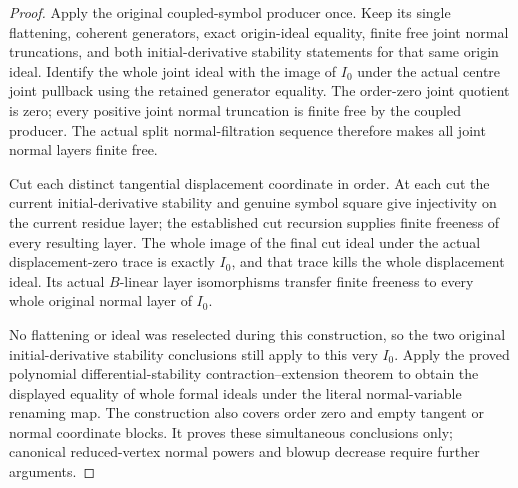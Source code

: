 \begin{proof}
Apply the original coupled-symbol producer once. Keep its single
flattening, coherent generators, exact origin-ideal equality, finite
free joint normal truncations, and both initial-derivative stability
statements for that same origin ideal. Identify the whole joint ideal
with the image of $I_0$ under the actual centre joint pullback using the
retained generator equality. The order-zero joint quotient is zero;
every positive joint normal truncation is finite free by the coupled
producer. The actual split normal-filtration sequence therefore makes
all joint normal layers finite free.

Cut each distinct tangential displacement coordinate in order. At each
cut the current initial-derivative stability and genuine symbol square
give injectivity on the current residue layer; the established cut
recursion supplies finite freeness of every resulting layer. The whole
image of the final cut ideal under the actual displacement-zero trace
is exactly $I_0$, and that trace kills the whole displacement ideal.
Its actual $B$-linear layer isomorphisms transfer finite freeness to
every whole original normal layer of $I_0$.

No flattening or ideal was reselected during this construction, so the
two original initial-derivative stability conclusions still apply to
this very $I_0$. Apply the proved polynomial differential-stability
contraction--extension theorem to obtain the displayed equality of
whole formal ideals under the literal normal-variable renaming map.
The construction also covers order zero and empty tangent or normal
coordinate blocks. It proves these simultaneous conclusions only;
canonical reduced-vertex normal powers and blowup decrease require
further arguments.
\end{proof}
